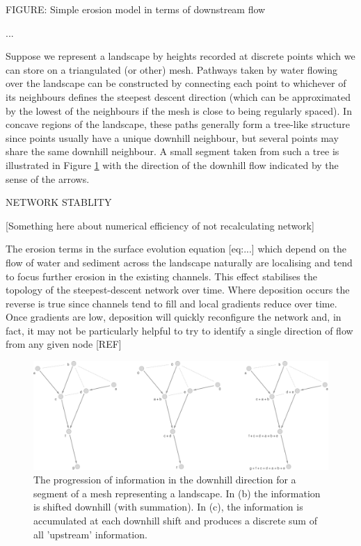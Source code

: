 \documentclass[draft,jgrga]{agu_template/AGUTeX}
\begin{document}
FIGURE: Simple erosion model in terms of downstream flow

...

Suppose we represent a landscape by heights recorded at discrete points which we can store on a triangulated (or other) mesh. Pathways taken by water flowing over the landscape can be constructed by connecting each point to whichever of its neighbours defines the steepest descent direction (which can be approximated by the lowest of the neighbours if the mesh is close to being regularly spaced). In concave regions of the landscape, these paths generally form a tree-like structure since points usually have a unique downhill neighbour, but several points may share the same downhill neighbour. A small segment taken from such a tree is illustrated in Figure \ref{fig:Tree} with the direction of the downhill flow indicated by the sense of the arrows.

NETWORK STABLITY

[Something here about numerical efficiency of not recalculating network]

The erosion terms in the surface evolution equation [eq:...] which depend on the flow of water and sediment across the landscape naturally are localising and tend to focus further erosion in the existing channels. This effect stabilises the topology of the steepest-descent network over time. Where deposition occurs the reverse is true since channels tend to fill and local gradients reduce over time. Once gradients are low, deposition will quickly reconfigure the network and, in fact, it may not be particularly helpful to try to identify a single direction of flow from any given node [REF]


\begin{figure}[hbt]
  \includegraphics[width=0.9\linewidth]{FigurePDFs/Network.pdf}
  \caption{\label{fig:Tree} The progression of information in the downhill direction for a segment of
  a mesh representing a landscape. In (b) the information is shifted downhill (with summation). In (c), the information is accumulated at each downhill shift and produces a discrete sum of all 'upstream' information.}
\end{figure}
\end{document}
